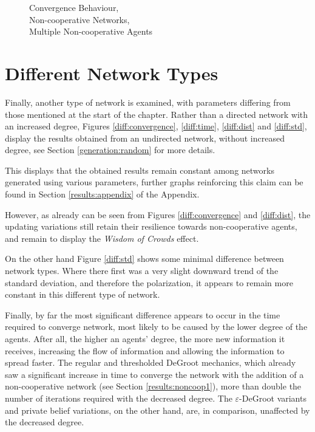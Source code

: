 \documentclass[a4paper, 12pt]{report}
\begin{document}
\begin{figure}[!htbp]
    \caption{Convergence Behaviour, \\ Non-cooperative Networks, \\ Multiple Non-cooperative Agents}
\end{figure}

\newpage

\section{Different Network Types}

Finally, another type of network is examined, with parameters differing from those mentioned at the start of the chapter. Rather than a directed network with an increased degree, Figures \ref{diff:convergence}, \ref{diff:time}, \ref{diff:dist} and \ref{diff:std}, display the results obtained from an undirected network, without increased degree, see Section \ref{generation:random} for more details.

\noindent This displays that the obtained results remain constant among networks generated using various parameters, further graphs reinforcing this claim can be found in Section \ref{results:appendix} of the Appendix.

\noindent However, as already can be seen from Figures \ref{diff:convergence} and \ref{diff:dist}, the updating variations still retain their resilience towards non-cooperative agents, and remain to display the \emph{Wisdom of Crowds} effect.

\noindent On the other hand Figure \ref{diff:std} shows some minimal difference between network types. Where there first was a very slight downward trend of the standard deviation, and therefore the polarization, it appears to remain more constant in this different type of network.

\noindent Finally, by far the most significant difference appears to occur in the time required to converge network, most likely to be caused by the lower degree of the agents. After all, the higher an agents' degree, the more new information it receives, increasing the flow of information and allowing the information to spread faster. The regular and thresholded DeGroot mechanics, which already saw a significant increase in time to converge the network with the addition of a non-cooperative network (see Section \ref{results:noncoop1}), more than double the number of iterations required with the decreased degree. The $\varepsilon$-DeGroot variants and private belief variations, on the other hand,  are, in comparison, unaffected by the decreased degree.
\end{document}
